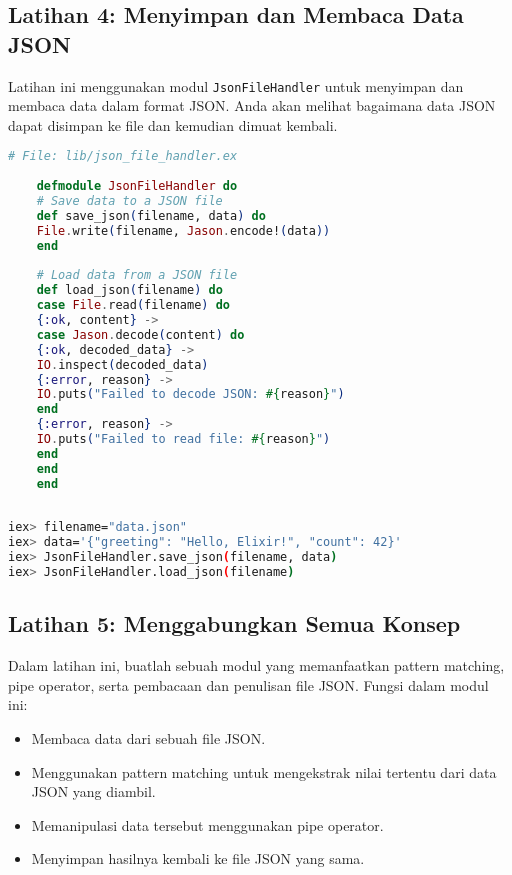 \subsection{Latihan 4: Menyimpan dan Membaca Data JSON}

Latihan ini menggunakan modul \texttt{JsonFileHandler} untuk menyimpan dan membaca data dalam format JSON. Anda akan melihat bagaimana data JSON dapat disimpan ke file dan kemudian dimuat kembali.

\begin{lstlisting}[language=Elixir]
	# File: lib/json_file_handler.ex
	
	defmodule JsonFileHandler do
	# Save data to a JSON file
	def save_json(filename, data) do
	File.write(filename, Jason.encode!(data))
	end
	
	# Load data from a JSON file
	def load_json(filename) do
	case File.read(filename) do
	{:ok, content} ->
	case Jason.decode(content) do
	{:ok, decoded_data} ->
	IO.inspect(decoded_data)
	{:error, reason} ->
	IO.puts("Failed to decode JSON: #{reason}")
	end
	{:error, reason} ->
	IO.puts("Failed to read file: #{reason}")
	end
	end
	end
	
\end{lstlisting}

\begin{lstlisting}[language=bash]
iex> filename="data.json"
iex> data='{"greeting": "Hello, Elixir!", "count": 42}'
iex> JsonFileHandler.save_json(filename, data)
iex> JsonFileHandler.load_json(filename)
\end{lstlisting}


\subsection{Latihan 5: Menggabungkan Semua Konsep}

Dalam latihan ini, buatlah sebuah modul yang memanfaatkan pattern matching, pipe operator, serta pembacaan dan penulisan file JSON. Fungsi dalam modul ini:
\begin{itemize}
	\item Membaca data dari sebuah file JSON.
	\item Menggunakan pattern matching untuk mengekstrak nilai tertentu dari data JSON yang diambil.
	\item Memanipulasi data tersebut menggunakan pipe operator.
	\item Menyimpan hasilnya kembali ke file JSON yang sama.
\end{itemize}

